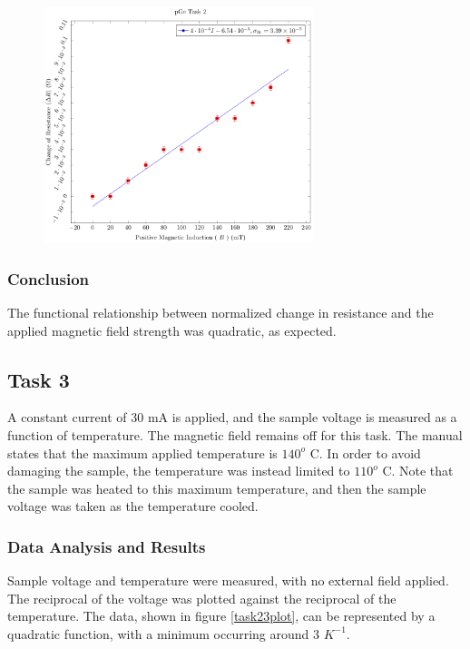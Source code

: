 \documentclass[a4paper]{article}
\begin{document}
\begin{figure}[H]
\centering
\includegraphics[width=0.7\textwidth]{PGePlots/Task2/pGeTask2.pdf}
\label{task22plot}
\end{figure}

\subsubsection{Conclusion}
\qq The functional relationship between normalized change in resistance
and the applied magnetic field strength was quadratic, as expected.

\subsection{Task 3}

\qq A constant current of 30 mA is applied, and the sample voltage is
measured as a function of temperature. The magnetic field remains off
for this task. The manual states that the maximum applied temperature
is $140^o$ C. In order to avoid damaging the sample, the temperature
was instead limited to $110^o$ C. Note that the sample was heated to
this maximum temperature, and then the sample voltage was taken as the
temperature cooled.

\subsubsection{Data Analysis and Results}
\qq Sample voltage and temperature were measured, with no external
field applied. The reciprocal of the voltage was plotted against the
reciprocal of the temperature. The data, shown in figure
\ref{task23plot}, can be represented by a quadratic function, with a
minimum occurring around 3 $K^{-1}$.
\end{document}

